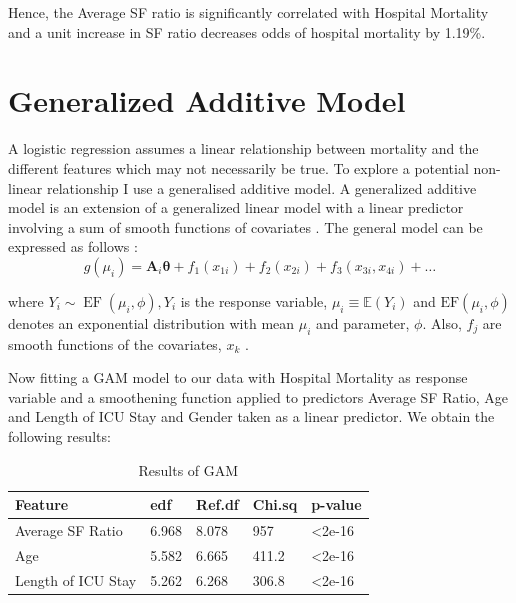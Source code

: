 Hence, the Average SF ratio is significantly correlated with Hospital Mortality and a unit increase in SF ratio decreases odds of
hospital mortality by 1.19\%.  


\section{Generalized Additive Model}

A logistic regression assumes a linear relationship between mortality and the different features which may not necessarily be true. To explore a potential non-linear relationship I use a generalised additive model. A generalized additive model is an extension of a generalized linear model with a linear predictor involving a sum of smooth functions of covariates \citep{hastie2017generalized}. The general model can be expressed as follows \citep{wood2017generalized}: 
\setlength\abovedisplayskip{4pt}
\setlength\belowdisplayskip{4pt}
\begin{equation*}
g\left(\mu_{i}\right)=\mathbf{A}_{i} \boldsymbol{\theta}+f_{1}\left(x_{1 i}\right)+f_{2}\left(x_{2 i}\right)+f_{3}\left(x_{3 i}, x_{4 i}\right)+\ldots
\end{equation*}

where  \(Y_{i} \sim \operatorname{EF}\left(\mu_{i}, \phi\right), Y_{i}\) is the response variable, \(\mu_{i} \equiv \mathbb{E}\left(Y_{i}\right)\) and \(\mathrm{EF}\left(\mu_{i}, \phi\right)\) denotes
an exponential distribution with mean \(\mu_{i}\) and parameter, \(\phi\). Also, \(f_{j}\) are smooth functions of the covariates, \(x_{k}\) \citep{wood2017generalized}. 

Now fitting a GAM model to our data with Hospital Mortality as response variable and a smoothening function applied to predictors Average SF Ratio, Age and Length of ICU Stay and Gender taken as a linear predictor. We obtain the following results: 


\begin{table}[H]
\begin{tabular}{|l|l|l|l|l|}
\hline
\textbf{Feature}         & \textbf{edf} & \textbf{Ref.df} & \textbf{Chi.sq} & \textbf{p-value} \\ \hline
Average SF Ratio          & 6.968        & 8.078           & 957             & \textless{}2e-16 \\ \hline
Age                   & 5.582        & 6.665           & 411.2           & \textless{}2e-16 \\ \hline
Length of ICU Stay& 5.262        & 6.268           & 306.8           & \textless{}2e-16 \\ \hline
\end{tabular}
\caption{Results of GAM}
\label{tab:GAM}
\end{table}

